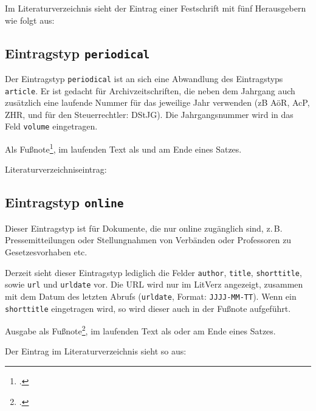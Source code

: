 
Im Literaturverzeichnis sieht der Eintrag einer Festschrift mit fünf Herausgebern wie folgt aus:

{}


\subsection{Eintragstyp \texttt{periodical}}


Der Eintragstyp \texttt{periodical} ist an sich eine Abwandlung des Eintragstyps \texttt{article}. Er ist 
gedacht für Archivzeitschriften, die neben dem Jahrgang auch zusätzlich eine laufende Nummer für 
das jeweilige Jahr verwenden (zB AöR, AcP, ZHR, und für den Steuerrechtler: DStJG). Die 
Jahrgangsnummer wird in das Feld \texttt{volume} eingetragen.

Als Fußnote\footcite{Lutz1995}, im laufenden Text als \cite{Lutz1995} und am Ende eines Satzes.~\parencite{Lutz1995}

Literaturverzeichniseintrag:

{}


\subsection{Eintragstyp \texttt{online}}


Dieser Eintragstyp ist für Dokumente, die nur online zugänglich sind, z.\,B. Pressemitteilungen oder 
Stellungnahmen von Verbänden oder Professoren zu Gesetzesvorhaben etc.

Derzeit sieht dieser Eintragstyp lediglich die Felder \texttt{author}, \texttt{title}, \texttt{shorttitle}, 
sowie \texttt{url} und \texttt{urldate} vor. Die URL wird nur im LitVerz angezeigt, zusammen mit dem 
Datum des letzten Abrufs (\texttt{urldate}, Format: \texttt{JJJJ-MM-TT}). Wenn ein \texttt{shorttitle} 
eingetragen wird, so wird dieser auch in der Fußnote aufgeführt.

Ausgabe als Fußnote\footcite[3]{Hirte2009}, im laufenden Text als \cite[3]{Hirte2009} oder am Ende
eines Satzes.~\parencite[3]{Hirte2009}


Der Eintrag im Literaturverzeichnis sieht so aus:


